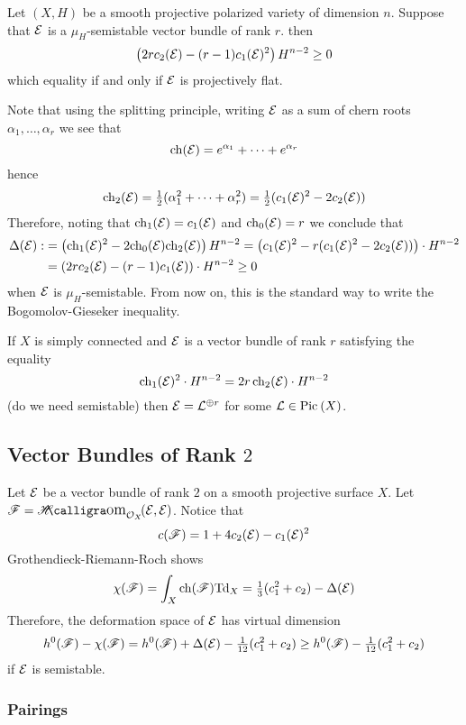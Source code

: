 \documentclass[12pt]{article}
\begin{document}
\begin{theorem}
Let $(X, H)$ be a smooth projective polarized variety of dimension $n$. Suppose that $\mathcal{E}$ is a $\mu_H$-semistable vector bundle of rank $r$. then
\[ \left( 2 r c_2(\mathcal{E}) - (r-1) c_1(\mathcal{E})^2 \right) H^{n-2} \ge 0 \]
which equality if and only if $\mathcal{E}$ is projectively flat.
\end{theorem}

\begin{rmk}
Note that using the splitting principle, writing $\mathcal{E}$ as a sum of chern roots $\alpha_1, \dots, \alpha_r$ we see that
\[ \mathrm{ch}(\mathcal{E}) = e^{\alpha_1} + \cdots + e^{\alpha_r} \]
hence
\[ \mathrm{ch}_2(\mathcal{E}) = \tfrac{1}{2} (\alpha_1^2 + \cdots + \alpha_r^2) = \tfrac{1}{2} (c_1(\mathcal{E})^2 - 2 c_2(\mathcal{E})) \]
Therefore, noting that $\mathrm{ch}_1(\mathcal{E}) = c_1(\mathcal{E})$ and $\mathrm{ch}_0(\mathcal{E}) = r$ we conclude that 
\begin{align*}
\Delta(\mathcal{E}) :&= \left( \mathrm{ch}_1(\mathcal{E})^2 - 2 \mathrm{ch}_0(\mathcal{E}) \mathrm{ch}_2(\mathcal{E}) \right) H^{n-2} = \left( c_1(\mathcal{E})^2 - r (c_1(\mathcal{E})^2 - 2 c_2(\mathcal{E})) \right) \cdot H^{n-2} 
\\
& = \left( 2 r c_2(\mathcal{E}) - (r-1) c_1(\mathcal{E}) \right) \cdot H^{n-2} \ge 0
\end{align*}
when $\mathcal{E}$ is $\mu_H$-semistable. From now on, this is the standard way to write the Bogomolov-Gieseker inequality.
\end{rmk}

\begin{cor}
If $X$ is simply connected and $\mathcal{E}$ is a vector bundle of rank $r$ satisfying the equality 
\[ \mathrm{ch}_1(\mathcal{E})^2 \cdot H^{n-2} = 2 r \, \mathrm{ch}_2(\mathcal{E}) \cdot H^{n-2} \]
(do we need semistable) then $\mathcal{E} = \mathcal{L}^{\oplus r}$ for some $\mathcal{L} \in \mathrm{Pic}^{} \left( X \right)$.
\end{cor}

\subsection{Vector Bundles of Rank $2$}

Let $\mathcal{E}$ be a vector bundle of rank $2$ on a smooth projective surface $X$. Let $\F = \shHom{\struct{X}}{\E}{\E}$. Notice that
\[ c(\mathscr{F}) = 1 + 4 c_2(\mathcal{E}) - c_1(\mathcal{E})^2 \]
Grothendieck-Riemann-Roch shows
\[ \chi(\mathscr{F}) = \int_X \mathrm{ch}(\mathscr{F}) \mathrm{Td}_X = \tfrac{1}{3} (c_1^2 + c_2) - \Delta(\mathcal{E}) \]
Therefore, the deformation space of $\mathcal{E}$ has virtual dimension 
\[ h^0(\mathscr{F}) - \chi(\mathscr{F}) = h^0(\mathscr{F}) + \Delta(\mathcal{E}) - \tfrac{1}{12} (c_1^2 + c_2) \ge h^0(\mathscr{F})  - \tfrac{1}{12} (c_1^2 + c_2) \]
if $\mathcal{E}$ is semistable.

\subsubsection{Pairings}
\end{document}
